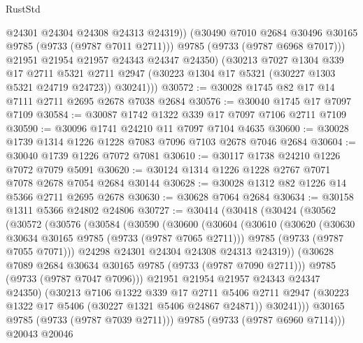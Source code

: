 \begin{lexlean}{RustStd}
\begin{coremodule}
{\begin{coremodule}
{{{{{{{{{{{{{{{{{{{{{{{{{{{{{{{{{{{{{{{{{{{{{{{{{{{{{{{                @24301
                @24304
                @24308
                @24313
                @24319))
            (@30490 @7010 @2684 @30496 @30165 @9785 (@9733 (@9787 @7011 @2711)))
            @9785
            (@9733 (@9787 @6968 @7017)))
          @21951
          @21954
          @21957
          @24343
          @24347
          @24350)
        (@30213
          @7027
          @1304
          @339
          @17
          @2711
          @5321
          @2711
          @2947
          (@30223 @1304 @17 @5321 (@30227 @1303 @5321 @24719 @24723))
          @30241)))
@30572 := @30028 @1745 @82 @17 @14 @7111 @2711 @2695 @2678 @7038 @2684
@30576 := @30040 @1745 @17 @7097 @7109
@30584 := @30087 @1742 @1322 @339 @17 @7097 @7106 @2711 @7109
@30590 := @30096 @1741 @24210 @11 @7097 @7104 @4635
@30600 := @30028 @1739 @1314 @1226 @1228 @7083 @7096 @7103 @2678 @7046 @2684
@30604 := @30040 @1739 @1226 @7072 @7081
@30610 := @30117 @1738 @24210 @1226 @7072 @7079 @5091
@30620 := @30124 @1314 @1226 @1228 @2767 @7071 @7078 @2678 @7054 @2684 @30144
@30628 := @30028 @1312 @82 @1226 @14 @5366 @2711 @2695 @2678
@30630 := @30628 @7064 @2684
@30634 := @30158 @1311 @5366 @24802 @24806
@30727 := @30414
    (@30418
      (@30424
        (@30562
          (@30572
            (@30576
              (@30584
                (@30590
                  (@30600
                    (@30604
                      (@30610
                        (@30620
                          (@30630 @30634 @30165 @9785 (@9733 (@9787 @7065 @2711)))
                          @9785
                          (@9733 (@9787 @7055 @7071)))
                        @24298
                        @24301
                        @24304
                        @24308
                        @24313
                        @24319))
                    (@30628 @7089 @2684 @30634 @30165 @9785 (@9733 (@9787 @7090 @2711)))
                    @9785
                    (@9733 (@9787 @7047 @7096)))
                  @21951
                  @21954
                  @21957
                  @24343
                  @24347
                  @24350)
                (@30213
                  @7106
                  @1322
                  @339
                  @17
                  @2711
                  @5406
                  @2711
                  @2947
                  (@30223 @1322 @17 @5406 (@30227 @1321 @5406 @24867 @24871))
                  @30241)))
            @30165
            @9785
            (@9733 (@9787 @7039 @2711)))
          @9785
          (@9733 (@9787 @6960 @7114)))
        @20043
        @20046
}}}}}}}}}}}}}}}}}}}}}}}}}}}}}}}}}}}}}}}}}}}}}}}}}}}}}}}
\end{coremodule}}
\end{coremodule}
\end{lexlean}
